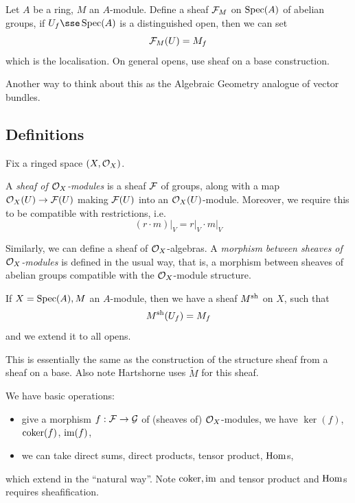 \documentclass{article}
\begin{document}
\begin{example}
     Let \(A\) be a ring, \(M\) an \(A\)-module. Define a sheaf \(\mathcal{F}_M\) on \(\operatorname{Spec}(A)\) of abelian groups, if \(U_f \sse \Spec(A)\) is a distinguished open, then we can set
    \[\mathcal{F}_M(U) = M_f\]
    which is the localisation. On general opens, use sheaf on a base construction.
\end{example}

Another way to think about this as the Algebraic Geometry analogue of vector bundles.

\subsection{Definitions}

Fix a ringed space \((X, \mathcal{O}_X)\).

\begin{definition}
     A \emph{sheaf of \(\mathcal{O}_X\)-modules} is a sheaf \(\mathcal{F}\) of groups, along with a map \(\mathcal{O}_X(U) \to \mathcal{F}(U)\) making \(\mathcal{F}(U)\) into an \(\mathcal{O}_X(U)\)-module. Moreover, we require this to be compatible with restrictions, i.e.
    \[(r \cdot m)\vert_V = r\vert_V \cdot m\vert_V\]
\end{definition}

Similarly, we can define a sheaf of \(\mathcal{O}_X\)-algebras. A \emph{morphism between sheaves of \(\mathcal{O}_X\)-modules} is defined in the usual way, that is, a morphism between sheaves of abelian groups compatible with the \(\mathcal{O}_X\)-module structure.

\lec

\begin{example}
    If \(X = \operatorname{Spec}(A), M\) an \(A\)-module, then we have a sheaf \(M^{\operatorname{sh}}\) on \(X\), such that
    \[M^{\operatorname{sh}}(U_f) = M_f\]
    and we extend it to all opens.
\end{example}

\begin{addendum}
    This is essentially the same as the construction of the structure sheaf from a sheaf on a base. Also note Hartshorne uses \(\widetilde{M}\) for this sheaf.
\end{addendum}

We have basic operations:
\begin{itemize}
    \item give a morphism \(f : \mathcal{F} \to \mathcal{G}\) of (sheaves of) \(\mathcal{O}_X\)-modules, we have \(\ker(f)\), \(\operatorname{coker}(f)\), \(\operatorname{im}(f)\),
    \item we can take direct sums, direct products, tensor product, \(\operatorname{Hom}\)s,
\end{itemize}
which extend in the ``natural way''. Note \(\operatorname{coker}, \operatorname{im}\) and tensor product and \(\operatorname{Hom}\)s requires sheafification.
\end{document}
